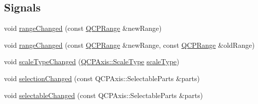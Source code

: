 \subsection*{Signals}
\begin{DoxyCompactItemize}
\item 
void \mbox{\hyperlink{class_q_c_p_axis_a0894084e4c16a1736534c4095746f910}{range\+Changed}} (const \mbox{\hyperlink{class_q_c_p_range}{Q\+C\+P\+Range}} \&new\+Range)
\item 
void \mbox{\hyperlink{class_q_c_p_axis_aac8576288e8e31f16186124bc10dd10d}{range\+Changed}} (const \mbox{\hyperlink{class_q_c_p_range}{Q\+C\+P\+Range}} \&new\+Range, const \mbox{\hyperlink{class_q_c_p_range}{Q\+C\+P\+Range}} \&old\+Range)
\item 
void \mbox{\hyperlink{class_q_c_p_axis_a3505ed8a93bd2e349d858d84996bf767}{scale\+Type\+Changed}} (\mbox{\hyperlink{class_q_c_p_axis_a36d8e8658dbaa179bf2aeb973db2d6f0}{Q\+C\+P\+Axis\+::\+Scale\+Type}} \mbox{\hyperlink{class_q_c_p_axis_ad23e9ad97b44e9aeaf4fab8904280098}{scale\+Type}})
\item 
void \mbox{\hyperlink{class_q_c_p_axis_a62b598abeee7174a05f9d542cc85b1f5}{selection\+Changed}} (const Q\+C\+P\+Axis\+::\+Selectable\+Parts \&parts)
\item 
void \mbox{\hyperlink{class_q_c_p_axis_aa5ff1fd851139028a3bb4efcb31de9fc}{selectable\+Changed}} (const Q\+C\+P\+Axis\+::\+Selectable\+Parts \&parts)
\end{DoxyCompactItemize}

